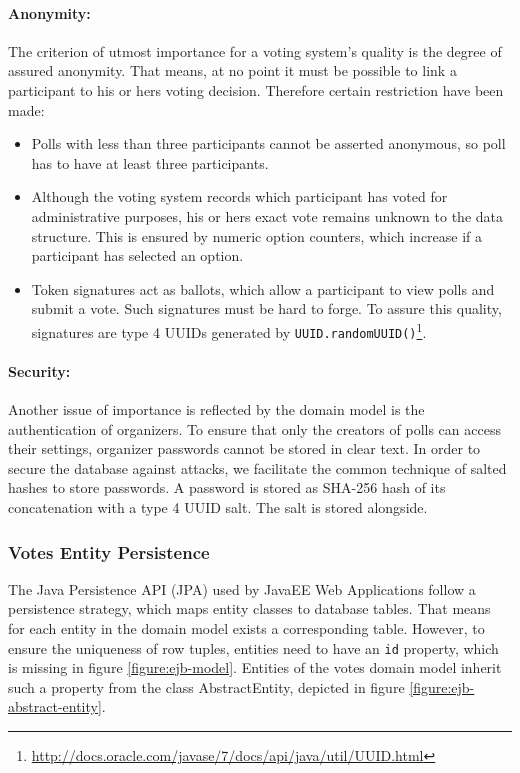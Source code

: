 \paragraph{Anonymity:}
The criterion of utmost importance for a voting system's quality is the degree of assured anonymity.
That means, at no point it must be possible to link a participant to his or hers voting decision.
Therefore certain restriction have been made:
\begin{itemize}

\item
Polls with less than three participants cannot be asserted anonymous, so poll has to have at least three participants.

\item
Although the voting system records which participant has voted for administrative purposes, his or hers exact vote remains unknown to the data structure.
This is ensured by numeric option counters, which increase if a participant has selected an option.

\item
Token signatures act as ballots, which allow a participant to view polls and submit a vote. 
Such signatures must be hard to forge.
To assure this quality, signatures are type 4 UUIDs generated by \texttt{UUID.randomUUID()}\footnote{\url{http://docs.oracle.com/javase/7/docs/api/java/util/UUID.html}}.

\end{itemize}


\paragraph{Security:}
Another issue of importance is reflected by the domain model is the authentication of organizers.
To ensure that only the creators of polls can access their settings, organizer passwords cannot be stored in clear text.
In order to secure the database against attacks, we facilitate the common technique of salted hashes to store passwords.
A password is stored as SHA-256 hash of its concatenation with a type 4 UUID salt.
The salt is stored alongside.


\subsubsection{Votes Entity Persistence}
\label{subsubsec:votes-entity-persistence}
The Java Persistence API (JPA) used by JavaEE Web Applications follow a persistence strategy, which maps entity classes to database tables.
That means for each entity in the domain model exists a corresponding table.
However, to ensure the uniqueness of row tuples, entities need to have an \texttt{id} property, which is missing in figure \ref{figure:ejb-model}.
Entities of the votes domain model inherit such a property from the class AbstractEntity, depicted in figure \ref{figure:ejb-abstract-entity}.

